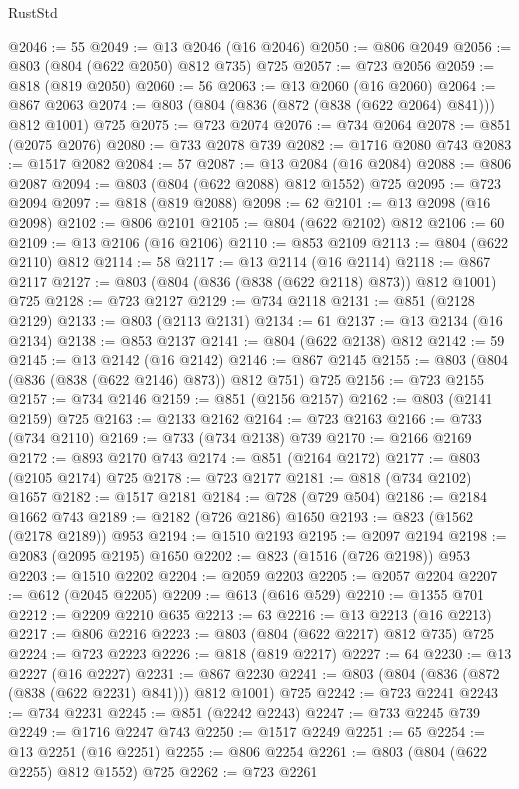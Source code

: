 \begin{lexlean}{RustStd}
\begin{coremodule}
@2046 := 55
@2049 := @13 @2046 (@16 @2046)
@2050 := @806 @2049
@2056 := @803 (@804 (@622 @2050) @812 @735) @725
@2057 := @723 @2056
@2059 := @818 (@819 @2050)
@2060 := 56
@2063 := @13 @2060 (@16 @2060)
@2064 := @867 @2063
@2074 := @803 (@804 (@836 (@872 (@838 (@622 @2064) @841))) @812 @1001) @725
@2075 := @723 @2074
@2076 := @734 @2064
@2078 := @851 (@2075 @2076)
@2080 := @733 @2078 @739
@2082 := @1716 @2080 @743
@2083 := @1517 @2082
@2084 := 57
@2087 := @13 @2084 (@16 @2084)
@2088 := @806 @2087
@2094 := @803 (@804 (@622 @2088) @812 @1552) @725
@2095 := @723 @2094
@2097 := @818 (@819 @2088)
@2098 := 62
@2101 := @13 @2098 (@16 @2098)
@2102 := @806 @2101
@2105 := @804 (@622 @2102) @812
@2106 := 60
@2109 := @13 @2106 (@16 @2106)
@2110 := @853 @2109
@2113 := @804 (@622 @2110) @812
@2114 := 58
@2117 := @13 @2114 (@16 @2114)
@2118 := @867 @2117
@2127 := @803 (@804 (@836 (@838 (@622 @2118) @873)) @812 @1001) @725
@2128 := @723 @2127
@2129 := @734 @2118
@2131 := @851 (@2128 @2129)
@2133 := @803 (@2113 @2131)
@2134 := 61
@2137 := @13 @2134 (@16 @2134)
@2138 := @853 @2137
@2141 := @804 (@622 @2138) @812
@2142 := 59
@2145 := @13 @2142 (@16 @2142)
@2146 := @867 @2145
@2155 := @803 (@804 (@836 (@838 (@622 @2146) @873)) @812 @751) @725
@2156 := @723 @2155
@2157 := @734 @2146
@2159 := @851 (@2156 @2157)
@2162 := @803 (@2141 @2159) @725
@2163 := @2133 @2162
@2164 := @723 @2163
@2166 := @733 (@734 @2110)
@2169 := @733 (@734 @2138) @739
@2170 := @2166 @2169
@2172 := @893 @2170 @743
@2174 := @851 (@2164 @2172)
@2177 := @803 (@2105 @2174) @725
@2178 := @723 @2177
@2181 := @818 (@734 @2102) @1657
@2182 := @1517 @2181
@2184 := @728 (@729 @504)
@2186 := @2184 @1662 @743
@2189 := @2182 (@726 @2186) @1650
@2193 := @823 (@1562 (@2178 @2189)) @953
@2194 := @1510 @2193
@2195 := @2097 @2194
@2198 := @2083 (@2095 @2195) @1650
@2202 := @823 (@1516 (@726 @2198)) @953
@2203 := @1510 @2202
@2204 := @2059 @2203
@2205 := @2057 @2204
@2207 := @612 (@2045 @2205)
@2209 := @613 (@616 @529)
@2210 := @1355 @701
@2212 := @2209 @2210 @635
@2213 := 63
@2216 := @13 @2213 (@16 @2213)
@2217 := @806 @2216
@2223 := @803 (@804 (@622 @2217) @812 @735) @725
@2224 := @723 @2223
@2226 := @818 (@819 @2217)
@2227 := 64
@2230 := @13 @2227 (@16 @2227)
@2231 := @867 @2230
@2241 := @803 (@804 (@836 (@872 (@838 (@622 @2231) @841))) @812 @1001) @725
@2242 := @723 @2241
@2243 := @734 @2231
@2245 := @851 (@2242 @2243)
@2247 := @733 @2245 @739
@2249 := @1716 @2247 @743
@2250 := @1517 @2249
@2251 := 65
@2254 := @13 @2251 (@16 @2251)
@2255 := @806 @2254
@2261 := @803 (@804 (@622 @2255) @812 @1552) @725
@2262 := @723 @2261

\end{coremodule}
\end{lexlean}
